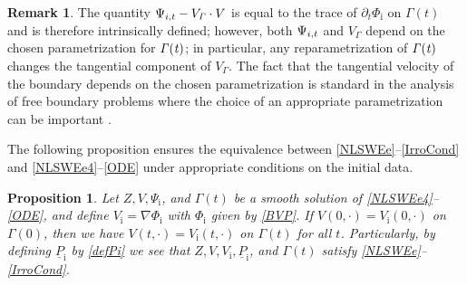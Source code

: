 \documentclass[11pt]{article}
\newcommand{\dt}{\partial_t}
\newcommand{\ul}[1]{\underline{#1}}
\newcommand{\itGamma}{\mathit{\Gamma}}
\newtheorem{proposition}[theorem]{Proposition}
\theoremstyle{definition}
\newtheorem{remark}[theorem]{Remark}
\begin{document}
\begin{remark}
The quantity $\Psi_{{\rm i},t} - V_\itGamma\cdot V$ is equal to the trace of $\dt\Phi_\mathrm{i}$ on $\itGamma(t)$ and is therefore intrinsically defined;
however, both $\Psi_{{\rm i},t} $ and $V_\itGamma$ depend on the chosen parametrization for $\it\Gamma(t)$;
in particular, any reparametrization of $\it\Gamma(t)$ changes the tangential component of $V_\itGamma$.
The fact that the tangential velocity of the boundary depends on the chosen parametrization is standard in the analysis of free boundary problems
where the choice of an appropriate parametrization can be important \cite{AmbroseMasmoudi,CordobaGancedo}.
\end{remark}

The following proposition ensures the equivalence between \eqref{NLSWEe}--\eqref{IrroCond} and \eqref{NLSWEe4}--\eqref{ODE} under appropriate conditions
on the initial data.

\begin{proposition}\label{prop:equiv}
Let $Z,V,\Psi_\mathrm{i}$, and $\itGamma(t)$ be a smooth solution of \eqref{NLSWEe4}--\eqref{ODE},
and define $V_\mathrm{i}=\nabla\Phi_\mathrm{i}$ with $\Phi_\mathrm{i}$ given by \eqref{BVP}.
If $V(0,\cdot)=V_\mathrm{i}(0,\cdot)$ on $\itGamma(0)$, then we have $V(t,\cdot)=V_\mathrm{i}(t,\cdot)$ on $\itGamma(t)$ for all $t$.
Particularly, by defining $\ul{P}_\mathrm{i}$ by \eqref{defPi} we see that $Z,V,V_\mathrm{i},\ul{P}_\mathrm{i}$, and $\itGamma(t)$ satisfy \eqref{NLSWEe}--\eqref{IrroCond}.
\end{proposition}
\end{document}
